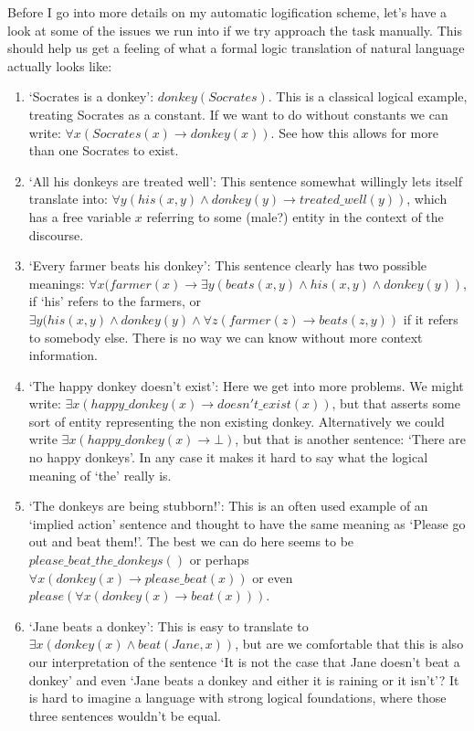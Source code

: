 \documentclass[12pt]{article}
\begin{document}
Before I go into more details on my automatic logification scheme, let's have a look at some of the issues we run into if we try approach the task manually. This should help us get a feeling of what a formal logic translation of natural language actually looks like:
\begin{enumerate}

\item `Socrates is a donkey': $donkey(Socrates)$. This is a classical logical example, treating Socrates as a constant. If we want to do without constants we can write: $\forall x(Socrates(x)\rightarrow donkey(x))$. See how this allows for more than one Socrates to exist.

\item `All his donkeys are treated well': This sentence somewhat willingly lets itself translate into: $\forall y(his(x,y)\wedge donkey(y) \rightarrow treated\_well(y))$, which has a free variable $x$ referring to some (male?) entity in the context of the discourse.

\item `Every farmer beats his donkey': This sentence clearly has two possible meanings: $\forall x(farmer(x)\rightarrow \exists y (beats(x,y)\wedge his(x,y)\wedge donkey(y))$, if `his' refers to the farmers, or $\exists y(his(x,y)\wedge donkey(y)\wedge \forall z(farmer(z) \rightarrow beats(z,y))$ if it refers to somebody else. There is no way we can know without more context information.

\item `The happy donkey doesn't exist': Here we get into more problems. We might write: $\exists x(happy\_donkey(x)\rightarrow doesn't\_exist(x))$, but that asserts some sort of entity representing the non existing donkey. Alternatively we could write $\exists x(happy\_donkey(x)\rightarrow \bot)$, but that is another sentence: `There are no happy donkeys'. In any case it makes it hard to say what the logical meaning of `the' really is.

\item `The donkeys are being stubborn!': This is an often used example of an `implied action' sentence and thought to have the same meaning as `Please go out and beat them!'. The best we can do here seems to be $please\_beat\_the\_donkeys()$ or perhaps $\forall x(donkey(x)\rightarrow please\_beat(x))$ or even $please(\forall x(donkey(x)\rightarrow beat(x)))$.

\item `Jane beats a donkey': This is easy to translate to $\exists x(donkey(x)\wedge beat(Jane,x))$, but are we comfortable that this is also our interpretation of the sentence `It is not the case that Jane doesn't beat a donkey' and even `Jane beats a donkey and either it is raining or it isn't'? It is hard to imagine a language with strong logical foundations, where those three sentences wouldn't be equal.
\end{enumerate}
\end{document}
